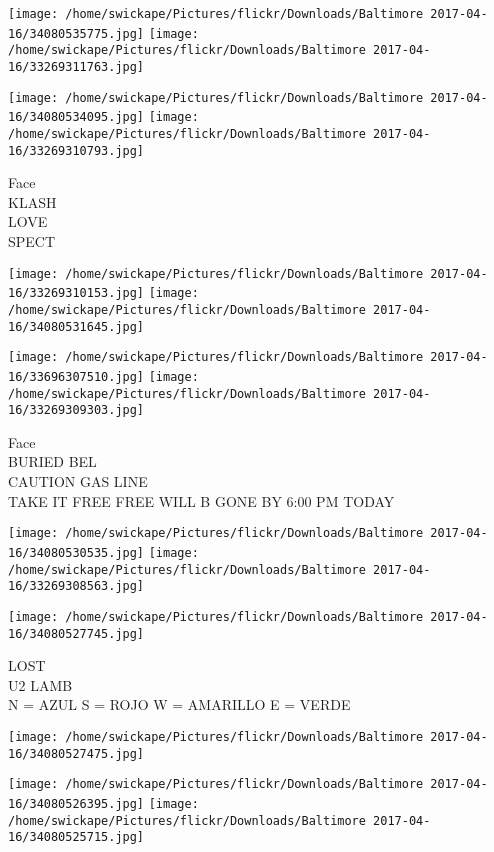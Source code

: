 \documentclass[10pt,letterpaper]{article}
\begin{document}
\texttt{[image: /home/swickape/Pictures/flickr/Downloads/Baltimore 2017-04-16/34080535775.jpg]}
\texttt{[image: /home/swickape/Pictures/flickr/Downloads/Baltimore 2017-04-16/33269311763.jpg]}

\texttt{[image: /home/swickape/Pictures/flickr/Downloads/Baltimore 2017-04-16/34080534095.jpg]}
\texttt{[image: /home/swickape/Pictures/flickr/Downloads/Baltimore 2017-04-16/33269310793.jpg]}

Face\\
KLASH\\
LOVE\\
SPECT\\
\pagebreak

\texttt{[image: /home/swickape/Pictures/flickr/Downloads/Baltimore 2017-04-16/33269310153.jpg]}
\texttt{[image: /home/swickape/Pictures/flickr/Downloads/Baltimore 2017-04-16/34080531645.jpg]}

\texttt{[image: /home/swickape/Pictures/flickr/Downloads/Baltimore 2017-04-16/33696307510.jpg]}
\texttt{[image: /home/swickape/Pictures/flickr/Downloads/Baltimore 2017-04-16/33269309303.jpg]}

Face\\
BURIED BEL\\
CAUTION GAS LINE\\
TAKE IT FREE FREE WILL B GONE BY 6:00 PM TODAY\\
\pagebreak

\texttt{[image: /home/swickape/Pictures/flickr/Downloads/Baltimore 2017-04-16/34080530535.jpg]}
\texttt{[image: /home/swickape/Pictures/flickr/Downloads/Baltimore 2017-04-16/33269308563.jpg]}

\texttt{[image: /home/swickape/Pictures/flickr/Downloads/Baltimore 2017-04-16/34080527745.jpg]}

LOST\\
U2 LAMB\\
N = AZUL S = ROJO W = AMARILLO E = VERDE\\
\pagebreak

\texttt{[image: /home/swickape/Pictures/flickr/Downloads/Baltimore 2017-04-16/34080527475.jpg]}

\vspace{0.25in}
\texttt{[image: /home/swickape/Pictures/flickr/Downloads/Baltimore 2017-04-16/34080526395.jpg]}
\texttt{[image: /home/swickape/Pictures/flickr/Downloads/Baltimore 2017-04-16/34080525715.jpg]}
\end{document}
